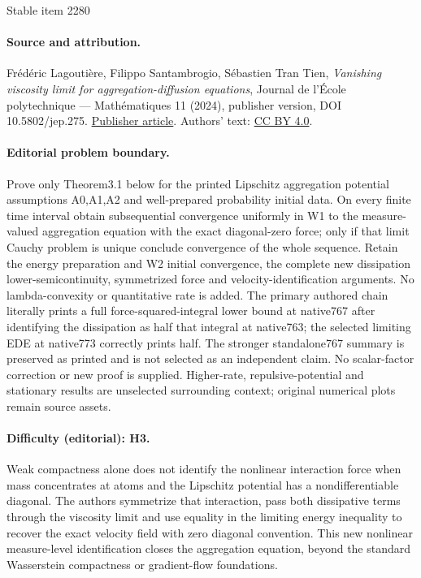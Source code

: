 \documentclass[11pt]{article}
\numberwithin{equation}{section}
\theoremstyle{plain}
\theoremstyle{definition}
\begin{document}
\begin{center}{\Large Stable item 2280}\end{center}
\paragraph{Source and attribution.}
Frédéric Lagoutière, Filippo Santambrogio, Sébastien Tran Tien, \emph{Vanishing viscosity limit for aggregation-diffusion equations}, Journal de l’École polytechnique — Mathématiques 11 (2024), publisher version, DOI 10.5802/jep.275. \href{https://jep.centre-mersenne.org/articles/10.5802/jep.275/}{Publisher article}. Authors' text: \href{https://creativecommons.org/licenses/by/4.0/}{CC BY 4.0}.
\paragraph{Editorial problem boundary.}
Prove only Theorem3.1 below for the printed Lipschitz aggregation potential assumptions A0,A1,A2 and well-prepared probability initial data. On every finite time interval obtain subsequential convergence uniformly in W1 to the measure-valued aggregation equation with the exact diagonal-zero force; only if that limit Cauchy problem is unique conclude convergence of the whole sequence. Retain the energy preparation and W2 initial convergence, the complete new dissipation lower-semicontinuity, symmetrized force and velocity-identification arguments. No lambda-convexity or quantitative rate is added. The primary authored chain literally prints a full force-squared-integral lower bound at native767 after identifying the dissipation as half that integral at native763; the selected limiting EDE at native773 correctly prints half. The stronger standalone767 summary is preserved as printed and is not selected as an independent claim. No scalar-factor correction or new proof is supplied. Higher-rate, repulsive-potential and stationary results are unselected surrounding context; original numerical plots remain source assets.
\paragraph{Difficulty (editorial): H3.}
Weak compactness alone does not identify the nonlinear interaction force when mass concentrates at atoms and the Lipschitz potential has a nondifferentiable diagonal. The authors symmetrize that interaction, pass both dissipative terms through the viscosity limit and use equality in the limiting energy inequality to recover the exact velocity field with zero diagonal convention. This new nonlinear measure-level identification closes the aggregation equation, beyond the standard Wasserstein compactness or gradient-flow foundations.
\end{document}
